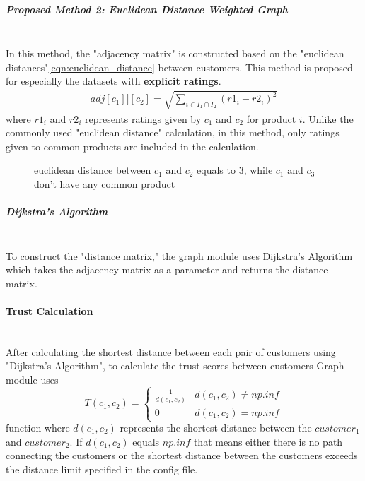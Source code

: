 \subparagraph{Proposed Method 2: Euclidean Distance Weighted Graph}\mbox{}\\
\label{prop_method_2}
In this method, the "adjacency matrix" is constructed based on the "euclidean distances"\ref{eqn:euclidean_distance} between customers. This method is proposed for especially the datasets with \textbf{explicit ratings}.
\begin{equation} 
	\label{eqn:euclidean_distance}
	\begin{split}
		adj[c_{1}]][c_{2}] = \sqrt{\sum_{i\in I_{1}\cap I_{2}}^{} (r1_{i}-r2_{i})^2}
	\end{split}
\end{equation}
where $r1_{i}$ and $r2_{i}$ represents ratings given by $c_{1}$ and $c_{2}$ for product $i$. Unlike the commonly used "euclidean distance" calculation, in this method, only ratings given to common products are included in the calculation.
\begin{figure}[H]
	\centering
	\caption{euclidean distance between $c_{1}$ and $c_{2}$ equals to 3, while $c_{1}$ and $c_{3}$ don't have any common product}
\end{figure}

\subparagraph{Dijkstra's Algorithm}\mbox{}\\
To construct the "distance matrix," the graph module uses \href{https://en.wikipedia.org/wiki/Dijkstra%27s_algorithm}{Dijkstra's Algorithm} which takes the adjacency matrix as a parameter and returns the distance matrix.

\paragraph{Trust Calculation}\mbox{}\\
After calculating the shortest distance between each pair of customers using "Dijkstra's Algorithm", to calculate the trust scores between customers Graph module uses
\begin{equation*} 
	T(c_{1}, c_{2})= \left\{
	\begin{array}{lr} 
		\frac{1}{d(c_{1}, c_{2})} & d(c_{1}, c_{2}) \neq np.inf \\
		0 & d(c_{1}, c_{2}) = np.inf
	\end{array}
	\right.
\end{equation*}
function where $d(c_{1}, c_{2})$ represents the shortest distance between the $customer_{1}$ and $customer_{2}$. If $d(c_{1}, c_{2})$ equals $np.inf$ that means either there is no path connecting the customers or the shortest distance between the customers exceeds the distance limit specified in the config file. \\


